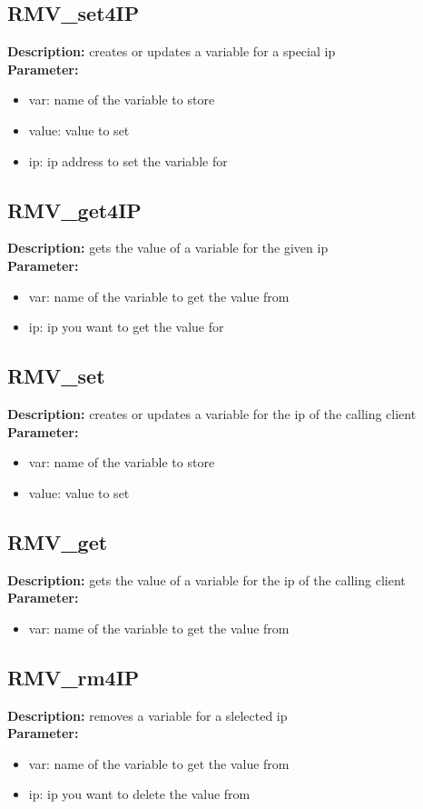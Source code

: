 \subsection{RMV\_set4IP}
\textbf{Description:} creates or updates a variable for a special ip\\
\textbf{Parameter:}
\begin{itemize}
\item var: name of the variable to store
\item value: value to set
\item ip: ip address to set the variable for
\end{itemize}

\subsection{RMV\_get4IP}
\textbf{Description:} gets the value of a variable for the given ip\\
\textbf{Parameter:}
\begin{itemize}
\item var: name of the variable to get the value from
\item ip: ip you want to get the value for
\end{itemize}

\subsection{RMV\_set}
\textbf{Description:} creates or updates a variable for the ip of the calling client\\
\textbf{Parameter:}
\begin{itemize}
\item var: name of the variable to store
\item value: value to set
\end{itemize}

\subsection{RMV\_get}
\textbf{Description:} gets the value of a variable for the ip of the calling client\\
\textbf{Parameter:}
\begin{itemize}
\item var: name of the variable to get the value from
\end{itemize}

\subsection{RMV\_rm4IP}
\textbf{Description:} removes a variable for a slelected ip\\
\textbf{Parameter:}
\begin{itemize}
\item var: name of the variable to get the value from
\item ip: ip you want to delete the value from
\end{itemize}

